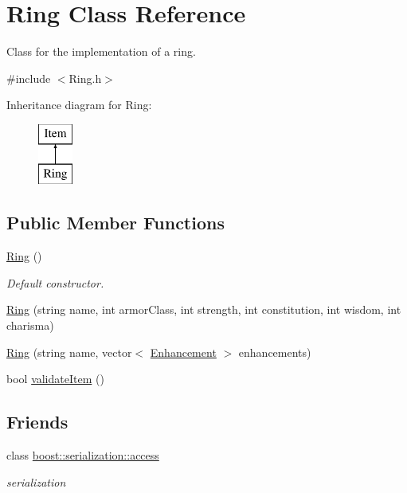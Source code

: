 \hypertarget{class_ring}{}\section{Ring Class Reference}
\label{class_ring}


Class for the implementation of a ring.  




{\ttfamily \#include $<$Ring.\+h$>$}

Inheritance diagram for Ring\+:\begin{figure}[H]
\begin{center}
\leavevmode
\includegraphics[height=2.000000cm]{class_ring}
\end{center}
\end{figure}
\subsection*{Public Member Functions}
\begin{DoxyCompactItemize}
\item 
\hypertarget{class_ring_afc47f40ab072db783126111b70693e49}{}\label{class_ring_afc47f40ab072db783126111b70693e49} 
\hyperlink{class_ring_afc47f40ab072db783126111b70693e49}{Ring} ()
\begin{DoxyCompactList}\small\item\em Default constructor. \end{DoxyCompactList}\item 
\hyperlink{class_ring_a029cccc4d2563fb2f9e85ab60d7e37d3}{Ring} (string name, int armor\+Class, int strength, int constitution, int wisdom, int charisma)
\item 
\hyperlink{class_ring_ae0295e0b34deab9238405440e62e1fb0}{Ring} (string name, vector$<$ \hyperlink{class_enhancement}{Enhancement} $>$ enhancements)
\item 
bool \hyperlink{class_ring_a9170e11e83f0a5b8443e9267e5bd6c8a}{validate\+Item} ()
\end{DoxyCompactItemize}
\subsection*{Friends}
\begin{DoxyCompactItemize}
\item 
\hypertarget{class_ring_ac98d07dd8f7b70e16ccb9a01abf56b9c}{}\label{class_ring_ac98d07dd8f7b70e16ccb9a01abf56b9c} 
class \hyperlink{class_ring_ac98d07dd8f7b70e16ccb9a01abf56b9c}{boost\+::serialization\+::access}
\begin{DoxyCompactList}\small\item\em serialization \end{DoxyCompactList}\end{DoxyCompactItemize}
